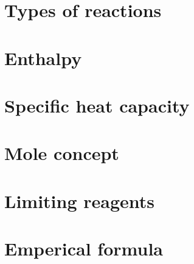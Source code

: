 \documentclass{book}
\begin{document}
\section{Types of reactions}

\section{Enthalpy}

\section{Specific heat capacity}

\section{Mole concept}

\section{Limiting reagents}

\section{Emperical formula}
\end{document}
